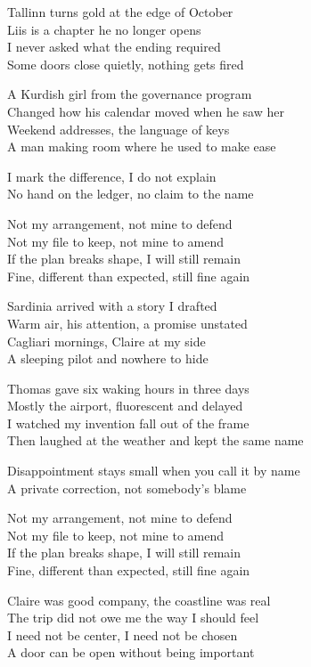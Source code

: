 \begin{lyrics}
Tallinn turns gold at the edge of October\\
Liis is a chapter he no longer opens\\
I never asked what the ending required\\
Some doors close quietly, nothing gets fired

A Kurdish girl from the governance program\\
Changed how his calendar moved when he saw her\\
Weekend addresses, the language of keys\\
A man making room where he used to make ease

I mark the difference, I do not explain\\
No hand on the ledger, no claim to the name

Not my arrangement, not mine to defend\\
Not my file to keep, not mine to amend\\
If the plan breaks shape, I will still remain\\
Fine, different than expected, still fine again

Sardinia arrived with a story I drafted\\
Warm air, his attention, a promise unstated\\
Cagliari mornings, Claire at my side\\
A sleeping pilot and nowhere to hide

Thomas gave six waking hours in three days\\
Mostly the airport, fluorescent and delayed\\
I watched my invention fall out of the frame\\
Then laughed at the weather and kept the same name

Disappointment stays small when you call it by name\\
A private correction, not somebody’s blame

Not my arrangement, not mine to defend\\
Not my file to keep, not mine to amend\\
If the plan breaks shape, I will still remain\\
Fine, different than expected, still fine again

Claire was good company, the coastline was real\\
The trip did not owe me the way I should feel\\
I need not be center, I need not be chosen\\
A door can be open without being important


\end{lyrics}
